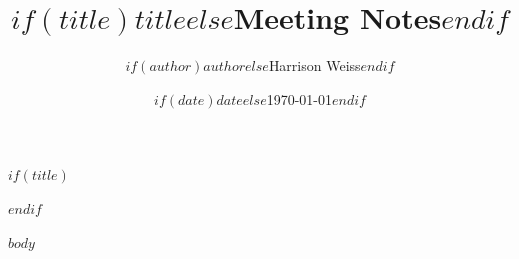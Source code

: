 \documentclass[11pt,letterpaper]{article}
\title{$if(title)$$title$$else$Meeting Notes$endif$}
\author{$if(author)$$author$$else$Harrison Weiss$endif$}
\date{$if(date)$$date$$else$\today$endif$}
\begin{document}
$if(title)$
\maketitle
\thispagestyle{plain}
\newpage
$endif$

$body$
\end{document}
